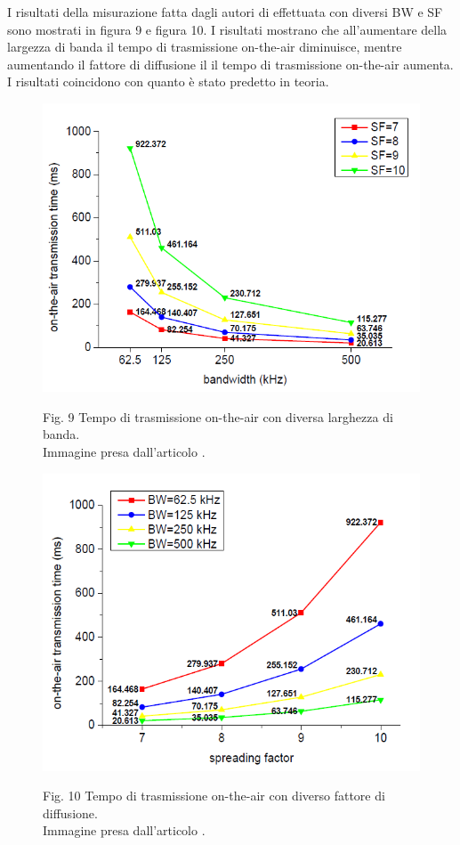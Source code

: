 \documentclass[a4paper]{report} %
\begin{document}
I risultati della misurazione fatta dagli autori di \cite{art:rif.44} effettuata con diversi BW e SF sono mostrati in figura 9 e figura 10. I risultati mostrano che all'aumentare della largezza di banda il tempo di trasmissione on-the-air diminuisce, mentre aumentando il fattore di diffusione il il tempo di trasmissione on-the-air aumenta. I risultati coincidono con quanto è stato predetto in teoria.
\begin{figure}
	\centering
	\includegraphics[scale=.5]{Immagini/r1.png}
	
	Fig. 9 Tempo di trasmissione on-the-air con diversa larghezza di banda.\\
	Immagine presa dall'articolo \cite{art:rif.44}.
\end{figure}

\begin{figure}
	\centering
	\includegraphics[scale=.5]{Immagini/r2.png}
	
	Fig. 10 Tempo di trasmissione on-the-air con diverso fattore di diffusione.\\
	Immagine presa dall'articolo \cite{art:rif.44}.
\end{figure}
\end{document}
